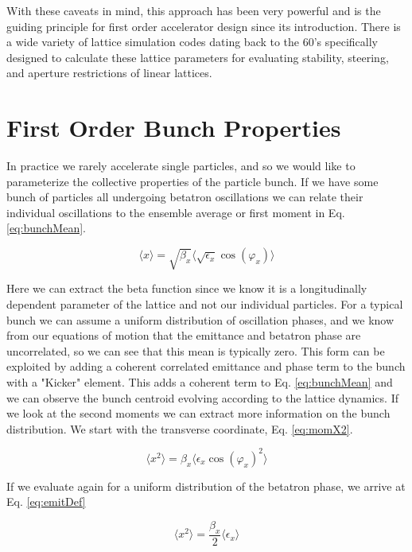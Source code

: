 With these caveats in mind, this approach has been very powerful and is the guiding principle for first order accelerator design since its introduction. There is a wide variety of lattice simulation codes dating back to the 60's specifically designed to calculate these lattice parameters for evaluating stability, steering, and aperture restrictions of linear lattices.

\section{First Order Bunch Properties} \label{sec:bunchEmit}
In practice we rarely accelerate single particles, and so we would like to parameterize the collective properties of the particle bunch. If we have some bunch of particles all undergoing betatron oscillations we can relate their individual oscillations to the ensemble average or first moment in Eq. \ref{eq:bunchMean}.

\begin{equation} \label{eq:bunchMean}
	\langle x \rangle  = \sqrt{\beta_x} \langle \sqrt{\epsilon_x} \cos{(\varphi_x)}\rangle 
\end{equation}

Here we can extract the beta function since we know it is a longitudinally dependent parameter of the lattice and not our individual particles. For a typical bunch we can assume a uniform distribution of oscillation phases, and we know from our equations of motion that the emittance and betatron phase are uncorrelated, so we can see that this mean is typically zero. This form can be exploited by adding a coherent correlated emittance and phase term to the bunch with a "Kicker" element. This adds a coherent term to Eq. \ref{eq:bunchMean} and we can observe the bunch centroid evolving according to the lattice dynamics. If we look at the second moments we can extract more information on the bunch distribution. We start with the transverse coordinate, Eq. \ref{eq:momX2}.

\begin{equation} \label{eq:momX2}
	\langle x^2 \rangle = \beta_x \langle \epsilon_x \cos{(\varphi_x)}^2 \rangle
\end{equation}

If we evaluate again for a uniform distribution of the betatron phase, we arrive at Eq. \ref{eq:emitDef}

\begin{equation} \label{eq:emitDef}
	\langle x^2 \rangle = \frac{\beta_x}{2} \langle \epsilon_x \rangle
\end{equation}


